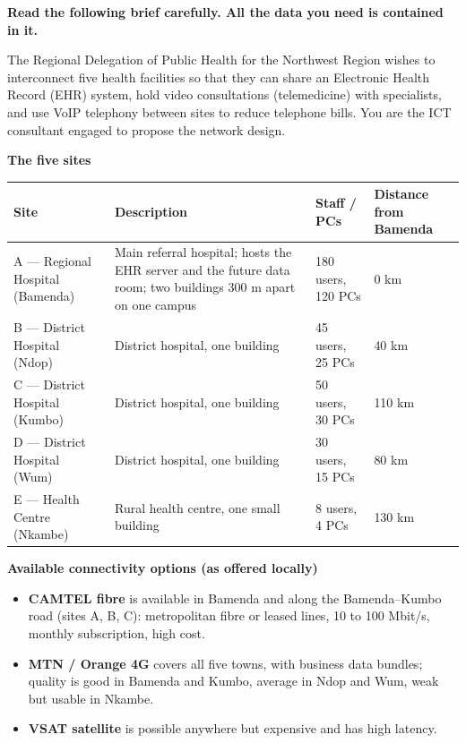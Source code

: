 \documentclass[11pt]{article}
\newcommand{\cle}[1]{{\popxbold\color{popdark}#1}}
\newcounter{popsec}
\newcounter{popsub}
\newcommand{\courssub}[1]{%
  \stepcounter{popsub}%
  \par\vspace{9pt}\noindent{\popxbold\fontsize{11.5}{13}\selectfont\color{popink}{\color{poporange}\thepopsec.\thepopsub}\hspace{6pt}#1}\par\nopagebreak\vspace{4pt}
}
\begin{document}
\courssub{Situation}

\textbf{Read the following brief carefully. All the data you need is contained in it.}

\begin{experience}
The Regional Delegation of Public Health for the Northwest Region wishes to interconnect five health facilities so that they can share an \cle{Electronic Health Record} (EHR) system, hold \cle{video consultations} (telemedicine) with specialists, and use \cle{VoIP} telephony between sites to reduce telephone bills. You are the ICT consultant engaged to propose the network design.

\textbf{The five sites}

\begin{center}
\begin{tabularx}{\linewidth}{|l|X|l|l|}
\hline
\rowcolor{popblueL} \textbf{Site} & \textbf{Description} & \textbf{Staff / PCs} & \textbf{Distance from Bamenda} \\
\hline
A — Regional Hospital (Bamenda) & Main referral hospital; hosts the EHR server and the future data room; two buildings 300 m apart on one campus & 180 users, 120 PCs & 0 km \\
\hline
B — District Hospital (Ndop) & District hospital, one building & 45 users, 25 PCs & 40 km \\
\hline
C — District Hospital (Kumbo) & District hospital, one building & 50 users, 30 PCs & 110 km \\
\hline
D — District Hospital (Wum) & District hospital, one building & 30 users, 15 PCs & 80 km \\
\hline
E — Health Centre (Nkambe) & Rural health centre, one small building & 8 users, 4 PCs & 130 km \\
\hline
\end{tabularx}
\end{center}

\textbf{Available connectivity options (as offered locally)}

\begin{itemize}
\item \textbf{CAMTEL fibre} is available in Bamenda and along the Bamenda–Kumbo road (sites A, B, C): metropolitan fibre or leased lines, 10 to 100 Mbit/s, monthly subscription, high cost.
\item \textbf{MTN / Orange 4G} covers all five towns, with business data bundles; quality is good in Bamenda and Kumbo, average in Ndop and Wum, weak but usable in Nkambe.
\item \textbf{VSAT satellite} is possible anywhere but expensive and has high latency.
\end{itemize}


\end{experience}
\end{document}
